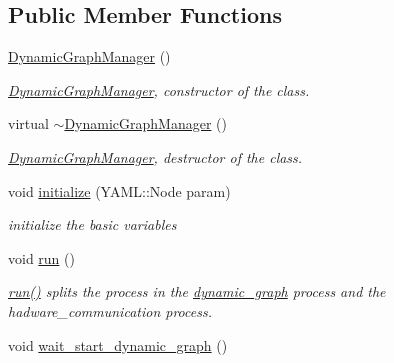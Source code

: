 \subsection*{Public Member Functions}
\begin{DoxyCompactItemize}
\item 
\hyperlink{classdynamic__graph_1_1DynamicGraphManager_afd98424082e5a1f878e6c7cb08a62c4a}{Dynamic\+Graph\+Manager} ()\hypertarget{classdynamic__graph_1_1DynamicGraphManager_afd98424082e5a1f878e6c7cb08a62c4a}{}\label{classdynamic__graph_1_1DynamicGraphManager_afd98424082e5a1f878e6c7cb08a62c4a}

\begin{DoxyCompactList}\small\item\em \hyperlink{classdynamic__graph_1_1DynamicGraphManager}{Dynamic\+Graph\+Manager}, constructor of the class. \end{DoxyCompactList}\item 
virtual \hyperlink{classdynamic__graph_1_1DynamicGraphManager_a6bcf93d16574035ee654289274d0a790}{$\sim$\+Dynamic\+Graph\+Manager} ()\hypertarget{classdynamic__graph_1_1DynamicGraphManager_a6bcf93d16574035ee654289274d0a790}{}\label{classdynamic__graph_1_1DynamicGraphManager_a6bcf93d16574035ee654289274d0a790}

\begin{DoxyCompactList}\small\item\em \hyperlink{classdynamic__graph_1_1DynamicGraphManager}{Dynamic\+Graph\+Manager}, destructor of the class. \end{DoxyCompactList}\item 
void \hyperlink{classdynamic__graph_1_1DynamicGraphManager_ac6859456bbdd4307cb880dc5e54131dd}{initialize} (Y\+A\+M\+L\+::\+Node param)\hypertarget{classdynamic__graph_1_1DynamicGraphManager_ac6859456bbdd4307cb880dc5e54131dd}{}\label{classdynamic__graph_1_1DynamicGraphManager_ac6859456bbdd4307cb880dc5e54131dd}

\begin{DoxyCompactList}\small\item\em initialize the basic variables \end{DoxyCompactList}\item 
void \hyperlink{classdynamic__graph_1_1DynamicGraphManager_a93272fcbb3793dfc92422186022ecf72}{run} ()
\begin{DoxyCompactList}\small\item\em \hyperlink{classdynamic__graph_1_1DynamicGraphManager_a93272fcbb3793dfc92422186022ecf72}{run()} splits the process in the \hyperlink{namespacedynamic__graph}{dynamic\+\_\+graph} process and the hadware\+\_\+communication process. \end{DoxyCompactList}\item 
void \hyperlink{classdynamic__graph_1_1DynamicGraphManager_a18dab9ca9c8901779a944386f2b8898c}{wait\+\_\+start\+\_\+dynamic\+\_\+graph} ()\hypertarget{classdynamic__graph_1_1DynamicGraphManager_a18dab9ca9c8901779a944386f2b8898c}{}\label{classdynamic__graph_1_1DynamicGraphManager_a18dab9ca9c8901779a944386f2b8898c}


\end{DoxyCompactItemize}
